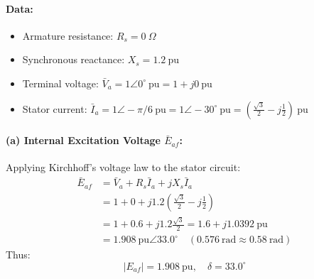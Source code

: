 \paragraph{Data:}
\begin{itemize}
    \item Armature resistance: $R_s = 0\ \Omega$
    \item Synchronous reactance: $X_s = 1.2\ \text{pu}$
    \item Terminal voltage: $\bar{V}_a = 1\angle 0^\circ\ \text{pu} = 1 + j0\ \text{pu}$
    \item Stator current: $\bar{I}_a = 1\angle -\pi/6\ \text{pu} = 1\angle -30^\circ\ \text{pu} = \left(\frac{\sqrt{3}}{2} - j\frac{1}{2}\right)\ \text{pu}$
\end{itemize}

\paragraph{(a) Internal Excitation Voltage $\bar{E}_{af}$:}
Applying Kirchhoff's voltage law to the stator circuit:
\begin{align}
    \bar{E}_{af} &= \bar{V}_a + R_s \bar{I}_a + j X_s \bar{I}_a \nonumber\\
                 &= 1 + 0 + j 1.2 \left(\frac{\sqrt{3}}{2} - j\frac{1}{2}\right) \nonumber\\
                 &= 1 + 0.6 + j 1.2 \frac{\sqrt{3}}{2} = 1.6 + j 1.0392\ \text{pu} \nonumber\\
                 &= \boxed{1.908\ \text{pu} \angle 33.0^\circ \quad (0.576\ \text{rad} \approx 0.58\ \text{rad})}
\end{align}
Thus:
\[
|E_{af}| = 1.908\ \text{pu},\quad \delta = 33.0^\circ
\]

